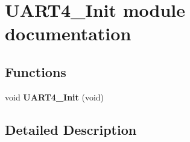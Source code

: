 \hypertarget{group___u_a_r_t4___init__module}{}\section{U\+A\+R\+T4\+\_\+\+Init module documentation}
\label{group___u_a_r_t4___init__module}
\subsection*{Functions}
\begin{DoxyCompactItemize}
\item 
void {\bfseries U\+A\+R\+T4\+\_\+\+Init} (void)\hypertarget{group___u_a_r_t4___init__module_ga42f712ff500c2b56f88a73ea79ff05cc}{}\label{group___u_a_r_t4___init__module_ga42f712ff500c2b56f88a73ea79ff05cc}

\end{DoxyCompactItemize}


\subsection{Detailed Description}
